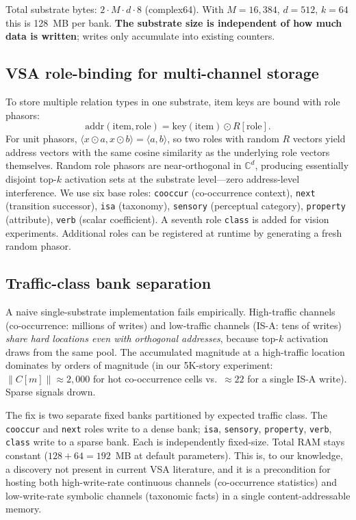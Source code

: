 \documentclass[11pt,a4paper]{article}
\begin{document}
Total substrate bytes: $2 \cdot M \cdot d \cdot 8$ (complex64).  With
$M = 16{,}384$, $d = 512$, $k = 64$ this is 128~MB per bank.
\textbf{The substrate size is independent of how much data is written};
writes only accumulate into existing counters.

\subsection{VSA role-binding for multi-channel storage}
To store multiple relation types in one substrate, item keys are bound
with role phasors:
\begin{equation}
  \mathrm{addr}(\mathrm{item}, \mathrm{role})
    = \mathrm{key}(\mathrm{item}) \odot R[\mathrm{role}].
  \label{eq:bind}
\end{equation}
For unit phasors,
$\langle x \odot a, x \odot b \rangle = \langle a, b \rangle$, so two roles
with random $R$ vectors yield address vectors with the same cosine
similarity as the underlying role vectors themselves.  Random role
phasors are near-orthogonal in $\mathbb{C}^d$, producing essentially
disjoint top-$k$ activation sets at the substrate level---zero
address-level interference.  We use six base roles:
\texttt{cooccur} (co-occurrence context), \texttt{next} (transition
successor), \texttt{isa} (taxonomy), \texttt{sensory} (perceptual
category), \texttt{property} (attribute), \texttt{verb} (scalar
coefficient).  A seventh role \texttt{class} is added for vision
experiments.  Additional roles can be registered at runtime by
generating a fresh random phasor.

\subsection{Traffic-class bank separation}
A naive single-substrate implementation fails empirically.  High-traffic
channels (co-occurrence: millions of writes) and low-traffic channels
(IS-A: tens of writes) \emph{share hard locations even with orthogonal
addresses}, because top-$k$ activation draws from the same pool.  The
accumulated magnitude at a high-traffic location dominates by orders of
magnitude (in our 5K-story experiment: $\|C[m]\| \approx 2{,}000$ for
hot co-occurrence cells vs.\ $\approx 22$ for a single IS-A write).
Sparse signals drown.

The fix is two separate fixed banks partitioned by expected traffic
class.  The \texttt{cooccur} and \texttt{next} roles write to a dense
bank;  \texttt{isa}, \texttt{sensory}, \texttt{property}, \texttt{verb},
\texttt{class} write to a sparse bank.  Each is independently
fixed-size.  Total RAM stays constant ($128 + 64 = 192$~MB at default
parameters).  This is, to our knowledge, a discovery not present in
current VSA literature, and it is a precondition for hosting both
high-write-rate continuous channels (co-occurrence statistics) and
low-write-rate symbolic channels (taxonomic facts) in a single
content-addressable memory.
\end{document}
